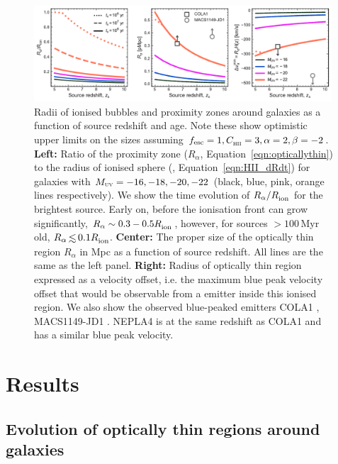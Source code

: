 \documentclass[fleqn,usenatbib]{mnras}
\begin{document}

\begin{figure}
    \includegraphics[width=0.99\textwidth]{figs/fig4.pdf}
    \caption{Radii of ionised bubbles and \lya proximity zones around galaxies as a function of source redshift and age. Note these show optimistic upper limits on the sizes assuming $\fesc=1, \clump=3, \alpha=2, \beta=-2$. \textbf{Left:} Ratio of the \lya proximity zone ($R_\alpha$, Equation~\ref{eqn:opticallythin}) to the radius of ionised sphere (\Rion, Equation~\ref{eqn:HII_dRdt}) for galaxies with $\MUV = -16, -18, -20, -22$ (black, blue, pink, orange lines respectively). We show the time evolution of $R_\alpha/\Rion$ for the brightest source. Early on, before the ionisation front can grow significantly, $R_\alpha \sim 0.3-0.5 \Rion$, however, for sources $>100$\,Myr old, $R_\alpha \simlt 0.1 \Rion$. \textbf{Center:} The proper size of the optically thin region $R_\alpha$ in Mpc as a function of source redshift. All lines are the same as the left panel. \textbf{Right:} Radius of optically thin region expressed as a \lya velocity offset, i.e. the maximum \lya blue peak velocity offset that would be observable from a \lya emitter inside this ionised region. We also show the observed blue-peaked \lya emitters COLA1 \citep{Hu2016,Matthee2018b}, MACS1149-JD1 \citep{Hashimoto2018a}. NEPLA4 \citep{Songaila2018} is at the same redshift as COLA1 and has a similar blue peak velocity.}
    \label{fig:R_HII}
\end{figure}

\section{Results}
\label{sec:results}

\subsection{Evolution of optically thin regions around galaxies}
\label{sec:results_opticallythin}
\end{document}
